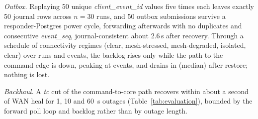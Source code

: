 \textit{Outbox.} Replaying 50 unique \textit{client\_event\_id} values five times each
leaves exactly 50 journal rows across $n=30$ runs, and 50 outbox submissions survive a
responder-Postgres power cycle, forwarding afterwards with no duplicates and consecutive
\textit{event\_seq}, journal-consistent about 2.6\,s after recovery. Through a schedule
of connectivity regimes (clear, mesh-stressed, mesh-degraded, isolated, clear) over
\scheduleRuns{} runs and \scheduleEvents{} events, the backlog rises only while the path to
the command edge is down, peaking at \schedulePeakBacklog{} events, and drains in
\scheduleDrainMedian{} (median) after restore; nothing is lost.

\textit{Backhaul.} A \textit{tc} cut of the command-to-core path recovers within about a
second of WAN heal for 1, 10 and 60~s outages (Table~\ref{tab:evaluation}), bounded by the
forward poll loop and backlog rather than by outage length.
